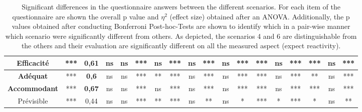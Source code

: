 \begin{table}
\begin{tabular}{c|c|c|c|c|c|c|c|c|c|c|c|c|c|c|c|c|c|}
        \multicolumn{1}{|c|}{\textbf{Efficacité}}   & *** & \textbf{0,61} & ns  & ns  & ***          & ns  & ***          & ns  & ***          & ns  & ***          & ***          & ns  & ***          & ***          & ns           & ***          \\ \hline
        \multicolumn{1}{|c|}{\textbf{Adéquat}}      & *** & \textbf{0,6}  & ns  & ns  & ***          & **  & ***          & ns  & ***          & ns  & ***          & ***          & ns  & ***          & **           & ns           & ***          \\ \hline
        \multicolumn{1}{|c|}{\textbf{Accommodant}}  & *** & \textbf{0,67} & ns  & ns  & ***          & ns  & ***          & ns  & ***          & ns  & ***          & ***          & ns  & ***          & ***          & ns           & ***          \\ \hline
        \multicolumn{1}{|c|}{Prévisible}            & *** & 0,44          & ns  & ns  & ***          & **  & ***          & ns  & **           & ns  & *            & ***          & *   & ***          & *            & ns           & **           \\ \hline
        \end{tabular}
    \caption{Significant differences in the questionnaire answers between the different scenarios. For each item of the questionnaire are shown the overall p value and $\eta^2$ (effect size) obtained after an ANOVA. Additionally, the p values obtained after conducting Bonferroni Post-hoc-Tests are shown to identify which in a pair-wise manner which scenario were significantly different from others. As depicted, the scenarios 4 and 6 are distinguishable from the others and their evaluation are significantly different on all the measured aspect (expect reactivity).}
    \label{tab:questionnaire_answers}
\end{table}

